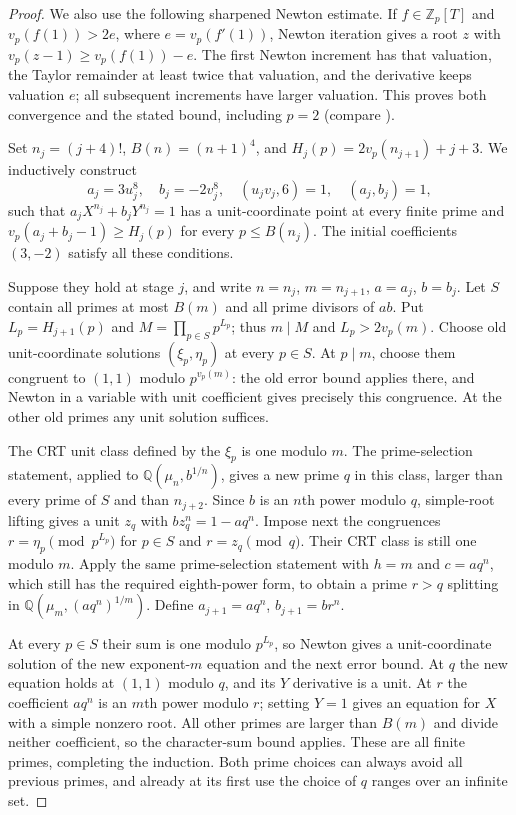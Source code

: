\begin{proof}
We also use the following sharpened Newton estimate. If
$f\in\mathbb Z_p[T]$ and $v_p(f(1))>2e$, where
$e=v_p(f'(1))$, Newton iteration gives a root $z$ with
$v_p(z-1)\ge v_p(f(1))-e$. The first Newton increment has that
valuation, the Taylor remainder at least twice that valuation, and the
derivative keeps valuation $e$; all subsequent increments have larger
valuation. This proves both convergence and the stated bound, including
$p=2$ (compare \citealp[Theorem 7.32 and the sharper bound on p.~121]{MilneANT2020}).

Set $n_j=(j+4)!$, $B(n)=(n+1)^4$, and
$H_j(p)=2v_p(n_{j+1})+j+3$. We inductively construct
\[
a_j=3u_j^8,\quad b_j=-2v_j^8,\quad (u_jv_j,6)=1,
\quad (a_j,b_j)=1,
\]
such that $a_jX^{n_j}+b_jY^{n_j}=1$ has a unit-coordinate point at
every finite prime and
$v_p(a_j+b_j-1)\ge H_j(p)$ for every $p\le B(n_j)$.
The initial coefficients $(3,-2)$ satisfy all these conditions.

Suppose they hold at stage $j$, and write $n=n_j$, $m=n_{j+1}$,
$a=a_j$, $b=b_j$. Let $S$ contain all primes at most $B(m)$ and all
prime divisors of $ab$. Put $L_p=H_{j+1}(p)$ and
$M=\prod_{p\in S}p^{L_p}$; thus $m\mid M$ and
$L_p>2v_p(m)$. Choose old unit-coordinate solutions
$(\xi_p,\eta_p)$ at every $p\in S$. At $p\mid m$, choose them
congruent to $(1,1)$ modulo $p^{v_p(m)}$: the old error bound applies
there, and Newton in a variable with unit coefficient gives precisely
this congruence. At the other old primes any unit solution suffices.

The CRT unit class defined by the $\xi_p$ is one modulo $m$.
The prime-selection statement, applied to $\mathbb Q(\mu_n,b^{1/n})$,
gives a new prime $q$ in this class, larger than every prime of $S$
and than $n_{j+2}$. Since $b$ is an $n$th power modulo $q$,
simple-root lifting gives a unit $z_q$ with
$bz_q^n=1-aq^n$. Impose next the congruences
$r=\eta_p\pmod{p^{L_p}}$ for $p\in S$ and
$r=z_q\pmod q$. Their CRT class is still one modulo $m$.
Apply the same prime-selection statement with $h=m$ and
$c=aq^n$, which still has the required eighth-power form, to obtain a
prime $r>q$ splitting in $\mathbb Q(\mu_m,(aq^n)^{1/m})$.
Define $a_{j+1}=aq^n$, $b_{j+1}=br^n$.

At every $p\in S$ their sum is one modulo $p^{L_p}$, so Newton gives
a unit-coordinate solution of the new exponent-$m$ equation and the
next error bound. At $q$ the new equation holds at $(1,1)$ modulo $q$,
and its $Y$ derivative is a unit. At $r$ the coefficient $aq^n$ is an
$m$th power modulo $r$; setting $Y=1$ gives an equation for $X$ with a
simple nonzero root. All other primes are larger than $B(m)$ and divide
neither coefficient, so the character-sum bound applies. These are all
finite primes, completing the induction. Both prime choices can always
avoid all previous primes, and already at its first use the choice of
$q$ ranges over an infinite set.


\end{proof}

